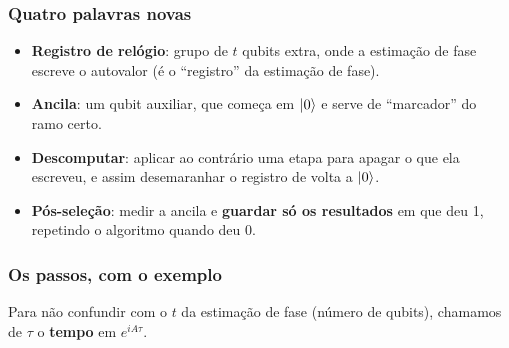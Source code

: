 \subsubsection{Quatro palavras novas}\label{quatro-palavras-novas}

\begin{itemize}
\tightlist
\item
  \textbf{Registro de relógio}: grupo de \(t\) qubits extra, onde a estimação de fase escreve o autovalor (é o ``registro'' da estimação de fase).
\item
  \textbf{Ancila}: um qubit auxiliar, que começa em \(\left|{0}\right>\) e serve de ``marcador'' do ramo certo.
\item
  \textbf{Descomputar}: aplicar ao contrário uma etapa para apagar o que ela escreveu, e assim desemaranhar o registro de volta a \(\left|{0}\right>\).
\item
  \textbf{Pós-seleção}: medir a ancila e \textbf{guardar só os resultados} em que deu 1, repetindo o algoritmo quando deu 0.
\end{itemize}

\subsubsection{Os passos, com o exemplo}\label{os-passos-com-o-exemplo}

Para não confundir com o \(t\) da estimação de fase (número de qubits), chamamos de \(\tau\) o \textbf{tempo} em \(e^{iA\tau}\).

